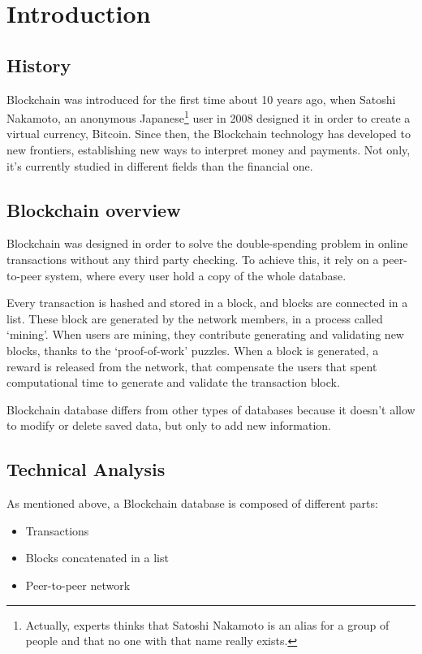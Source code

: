 \section{Introduction}

\subsection{History}
Blockchain was introduced for the first time about 10 years ago, when Satoshi
Nakamoto, an anonymous Japanese\footnote{Actually, experts thinks that Satoshi
Nakamoto is an alias for a group of people and that no one with that name
really exists.} user in 2008 designed it in order to create a virtual currency,
Bitcoin. Since then, the Blockchain technology has developed to new frontiers,
establishing new ways to interpret money and payments. Not only, it's currently
studied in different fields than the financial one.

\subsection{Blockchain overview}
Blockchain was designed in order to solve the double-spending problem in
online transactions without any third party checking\cite{nakamoto08}. To
achieve this, it rely on a peer-to-peer system, where every user hold a copy of
the whole database.

Every transaction is hashed and stored in a block, and blocks are connected in
a list. These block are generated by the network members, in a process called
`mining'. When users are mining, they contribute generating and validating new
blocks, thanks to the `proof-of-work' puzzles. When a block is generated, a
reward is released from the network, that compensate the users that spent
computational time to generate and validate the transaction block.

Blockchain database differs from other types of databases because it doesn't
allow to modify or delete saved data, but only to add new information.

\subsection{Technical Analysis}

As mentioned above, a Blockchain database is composed of different
parts\cite{sok15}:
\begin{itemize}
 \item Transactions
 \item Blocks concatenated in a list
 \item Peer-to-peer network
\end{itemize}

